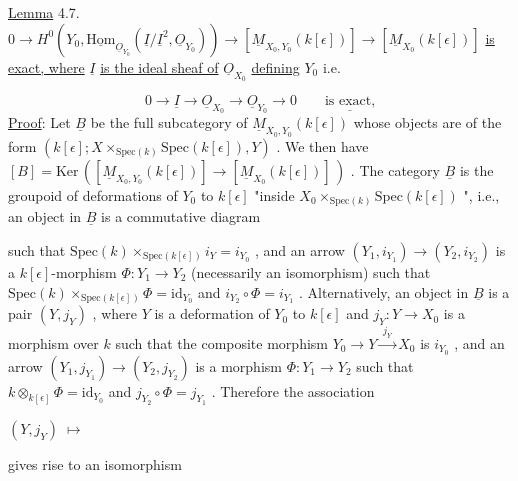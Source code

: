 \underline{Lemma} 4.7.  $0 \to H^{0}(Y_{0}, \underline{\mathrm{Hom}}_{\underline{O}_{Y_{0}}} (\underline{I}/\underline{I}^{2}, \underline{O}_{Y_{0}})) \to [\underline{M}_{X_{0},Y_{0}}(k[\epsilon])] \to [\underline{M}_{X_{0}}(k[\epsilon])]$ \underline{is exact, where}  $\underline{I}$  \underline{is the ideal sheaf of}  $\underline{O}_{X_{0}}$  \underline{defining}  $Y_{0}$  i.e. 



\begin{equation*}
 0 \to \underline{I} \to \underline{O}_{X_0} \to \underline{O}_{Y_0} \to 0 \qquad \underline{\text{is exact,}}
\end{equation*}
\underline{Proof}: Let $\underline{B}$ be the full subcategory of $\underline{M}_{X_0,Y_0}(k[\epsilon])$ whose objects are of the form $(k[\epsilon]; X \times_{\mathrm{Spec}(k)} \mathrm{Spec}(k[\epsilon]), Y)$ . We then have $[B] = \mathrm{Ker}\,([\underline{M}_{X_0,Y_0}(k[\epsilon])] \to [\underline{M}_{X_0}(k[\epsilon])]\,)$ . The category $\underline{B}$ is the groupoid of deformations of $Y_0$ to $k[\epsilon]$ "inside $X_0 \times_{\mathrm{Spec}(k)} \mathrm{Spec}(k[\epsilon])$ ", i.e., an object in $\underline{B}$ is a commutative diagram

\begin{center}
\end{center}
such that $\mathrm{Spec}(k) \times_{\mathrm{Spec}(k[\epsilon])} i_Y = i_{Y_0}$ , and an arrow $(Y_1, i_{Y_1}) \to (Y_2, i_{Y_2})$ is a $k[\epsilon]$-morphism $\Phi : Y_1 \to Y_2$ (necessarily an isomorphism) such that $\mathrm{Spec}(k) \times_{\mathrm{Spec}(k[\epsilon])} \Phi = \mathrm{id}_{Y_0}$ and $i_{Y_2} \circ \Phi = i_{Y_1}$ . Alternatively, an object in $\underline{B}$ is a pair $(Y, j_Y)$ , where $Y$ is a deformation of $Y_0$ to $k[\epsilon]$ and $j_Y : Y \to X_0$ is a morphism over $k$ such that the composite morphism $Y_0 \to Y \xrightarrow{\;j_Y\;} X_0$ is $i_{Y_0}$ , and an arrow $(Y_1, j_{Y_1}) \to (Y_2, j_{Y_2})$ is a morphism $\Phi : Y_1 \to Y_2$ such that $k \otimes_{k[\epsilon]} \Phi = \mathrm{id}_{Y_0}$ and $j_{Y_2} \circ \Phi = j_{Y_1}$ . Therefore the association

$(Y, j_Y) \;\longmapsto\;$
gives rise to an isomorphism

